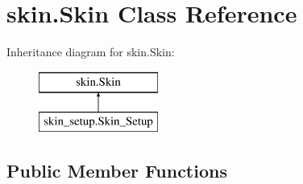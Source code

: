 \hypertarget{classskin_1_1Skin}{}\section{skin.\+Skin Class Reference}
\label{classskin_1_1Skin}
Inheritance diagram for skin.\+Skin\+:\begin{figure}[H]
\begin{center}
\leavevmode
\includegraphics[height=2.000000cm]{classskin_1_1Skin}
\end{center}
\end{figure}
\subsection*{Public Member Functions}
